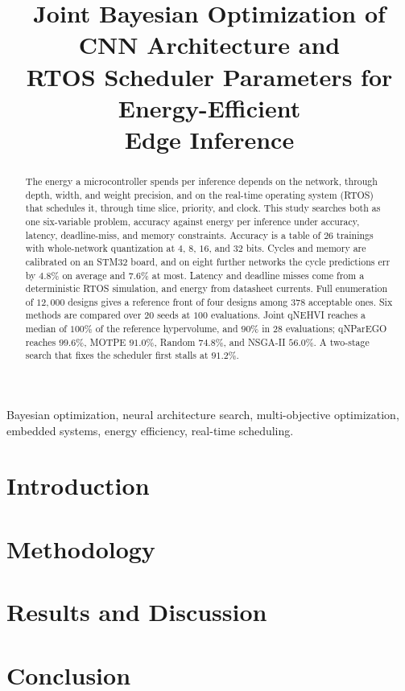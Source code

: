 \documentclass[conference]{IEEEtran}
\begin{document}
\title{Joint Bayesian Optimization of CNN Architecture and\\
       RTOS Scheduler Parameters for Energy-Efficient\\
       Edge Inference}

\author{
}

\maketitle

\begin{abstract}
The energy a microcontroller spends per inference depends on the
network, through depth, width, and weight precision, and on the real-time
operating system (RTOS) that schedules it, through time slice, priority, and
clock. This study searches both as one six-variable problem, accuracy
against energy per inference under accuracy, latency, deadline-miss, and
memory constraints. Accuracy is a table of $26$ trainings with
whole-network quantization at $4$, $8$, $16$, and $32$ bits. Cycles and
memory are calibrated on an STM32 board, and on eight further networks the
cycle predictions err by $4.8\%$ on average and $7.6\%$ at most. Latency and
deadline misses come from a deterministic RTOS simulation, and energy from
datasheet currents. Full enumeration of $12{,}000$ designs gives a reference
front of four designs among $378$ acceptable ones. Six methods are compared
over $20$ seeds at $100$ evaluations. Joint qNEHVI reaches a median of $100\%$
of the reference hypervolume, and $90\%$ in $28$ evaluations; qNParEGO reaches
$99.6\%$, MOTPE $91.0\%$, Random $74.8\%$, and NSGA-II $56.0\%$. A two-stage
search that fixes the scheduler first stalls at $91.2\%$.
\end{abstract}

\begin{IEEEkeywords}
Bayesian optimization, neural architecture search, multi-objective
optimization, embedded systems, energy efficiency, real-time scheduling.
\end{IEEEkeywords}

\section{Introduction}
\label{sec:intro}


\section{Methodology}
\label{sec:methodology}


\section{Results and Discussion}
\label{sec:results}


\section{Conclusion}
\label{sec:conclusion}




\end{document}
